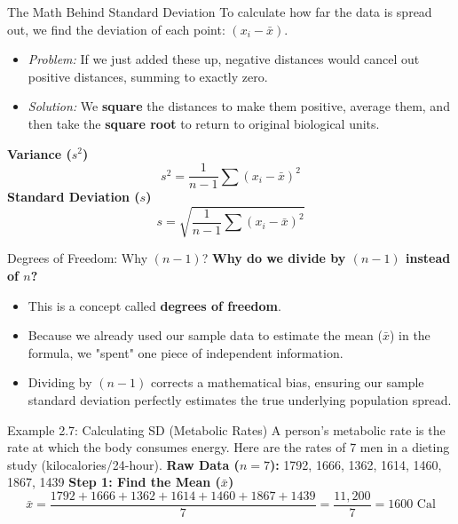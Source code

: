 \documentclass[aspectratio=169]{beamer}
\begin{document}
\begin{frame}{The Math Behind Standard Deviation}
To calculate how far the data is spread out, we find the deviation of each point: $(x_i - \bar{x})$. 
\vspace{0.2cm}
\begin{itemize}
	\item \emph{Problem:} If we just added these up, negative distances would cancel out positive distances, summing to exactly zero.
	\item \emph{Solution:} We \textbf{square} the distances to make them positive, average them, and then take the \textbf{square root} to return to original biological units.
\end{itemize}
\vspace{0.2cm}
\textbf{Variance ($s^2$)}
$$ s^2 = \frac{1}{n-1} \sum (x_i - \bar{x})^2 $$
\textbf{Standard Deviation ($s$)}
$$ s = \sqrt{\frac{1}{n-1} \sum (x_i - \bar{x})^2} $$
\end{frame}

\begin{frame}{Degrees of Freedom: Why $(n-1)$?}
\textbf{Why do we divide by $(n-1)$ instead of $n$?}
\vspace{0.3cm}
\begin{itemize}
	\item This is a concept called \textbf{degrees of freedom}. 
	\item Because we already used our sample data to estimate the mean ($\bar{x}$) in the formula, we "spent" one piece of independent information. 
	\item Dividing by $(n-1)$ corrects a mathematical bias, ensuring our sample standard deviation perfectly estimates the true underlying population spread.
\end{itemize}
\end{frame}

\begin{frame}{Example 2.7: Calculating SD (Metabolic Rates)}
A person's metabolic rate is the rate at which the body consumes energy. Here are the rates of 7 men in a dieting study (kilocalories/24-hour).
\vspace{0.2cm}
\textbf{Raw Data ($n=7$):} 1792, 1666, 1362, 1614, 1460, 1867, 1439
\vspace{0.4cm}
\textbf{Step 1: Find the Mean ($\bar{x}$)}
$$ \bar{x} = \frac{1792 + 1666 +1362 + 1614 + 1460 + 1867 + 1439}{7} = \frac{11{,}200}{7} = 1600 \text{ Cal} $$
\end{frame}
\end{document}
